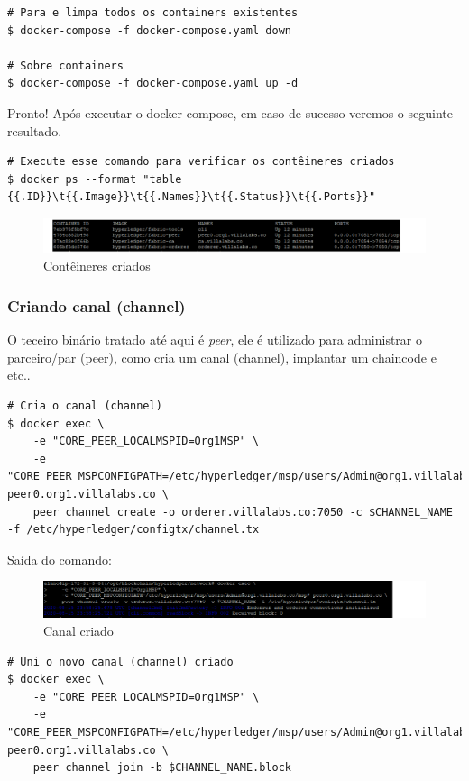 \documentclass[a4paper,11pt]{article}
\begin{document}
\begin{lstlisting}
# Para e limpa todos os containers existentes
$ docker-compose -f docker-compose.yaml down

# Sobre containers
$ docker-compose -f docker-compose.yaml up -d
\end{lstlisting}

Pronto! Após executar o docker-compose, em caso de sucesso veremos o seguinte resultado.
\begin{lstlisting}
# Execute esse comando para verificar os contêineres criados
$ docker ps --format "table {{.ID}}\t{{.Image}}\t{{.Names}}\t{{.Status}}\t{{.Ports}}"
\end{lstlisting}
\begin{figure}[H]
  \centering
  \includegraphics[width=1.1\textwidth]{imagens/conteineres.png}
  \caption{Contêineres criados}
\end{figure}

\subsubsection{Criando canal (channel)}
O teceiro binário tratado até aqui é \textit{peer}, ele é utilizado para administrar o parceiro/par (peer), como cria um canal (channel), implantar um chaincode e etc..

\begin{lstlisting}
# Cria o canal (channel)
$ docker exec \
    -e "CORE_PEER_LOCALMSPID=Org1MSP" \
    -e "CORE_PEER_MSPCONFIGPATH=/etc/hyperledger/msp/users/Admin@org1.villalabs.co/msp" peer0.org1.villalabs.co \
    peer channel create -o orderer.villalabs.co:7050 -c $CHANNEL_NAME -f /etc/hyperledger/configtx/channel.tx
\end{lstlisting}

Saída do comando:
\begin{figure}[H]
  \centering
  \includegraphics[width=1.1\textwidth]{imagens/criando-canal.png}
  \caption{Canal criado}
\end{figure}

\begin{lstlisting}
# Uni o novo canal (channel) criado
$ docker exec \
    -e "CORE_PEER_LOCALMSPID=Org1MSP" \
    -e "CORE_PEER_MSPCONFIGPATH=/etc/hyperledger/msp/users/Admin@org1.villalabs.co/msp" peer0.org1.villalabs.co \
    peer channel join -b $CHANNEL_NAME.block
\end{lstlisting}
\end{document}
